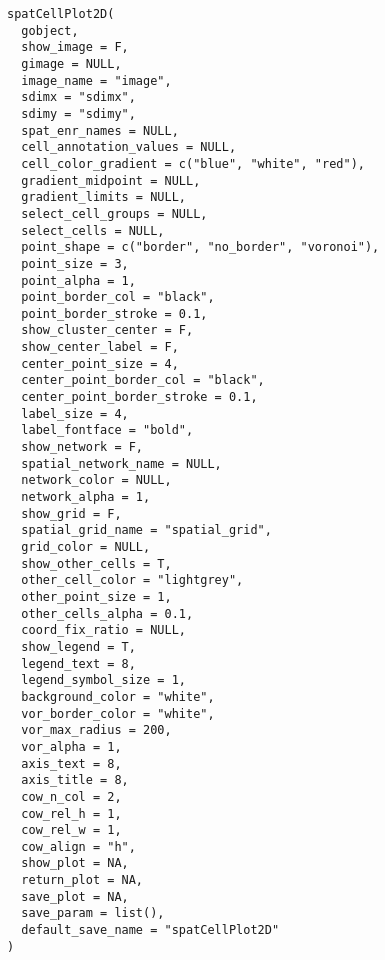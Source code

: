 \documentclass[a4paper]{book}
\begin{document}
\begin{Usage}
\begin{verbatim}
spatCellPlot2D(
  gobject,
  show_image = F,
  gimage = NULL,
  image_name = "image",
  sdimx = "sdimx",
  sdimy = "sdimy",
  spat_enr_names = NULL,
  cell_annotation_values = NULL,
  cell_color_gradient = c("blue", "white", "red"),
  gradient_midpoint = NULL,
  gradient_limits = NULL,
  select_cell_groups = NULL,
  select_cells = NULL,
  point_shape = c("border", "no_border", "voronoi"),
  point_size = 3,
  point_alpha = 1,
  point_border_col = "black",
  point_border_stroke = 0.1,
  show_cluster_center = F,
  show_center_label = F,
  center_point_size = 4,
  center_point_border_col = "black",
  center_point_border_stroke = 0.1,
  label_size = 4,
  label_fontface = "bold",
  show_network = F,
  spatial_network_name = NULL,
  network_color = NULL,
  network_alpha = 1,
  show_grid = F,
  spatial_grid_name = "spatial_grid",
  grid_color = NULL,
  show_other_cells = T,
  other_cell_color = "lightgrey",
  other_point_size = 1,
  other_cells_alpha = 0.1,
  coord_fix_ratio = NULL,
  show_legend = T,
  legend_text = 8,
  legend_symbol_size = 1,
  background_color = "white",
  vor_border_color = "white",
  vor_max_radius = 200,
  vor_alpha = 1,
  axis_text = 8,
  axis_title = 8,
  cow_n_col = 2,
  cow_rel_h = 1,
  cow_rel_w = 1,
  cow_align = "h",
  show_plot = NA,
  return_plot = NA,
  save_plot = NA,
  save_param = list(),
  default_save_name = "spatCellPlot2D"
)
\end{verbatim}
\end{Usage}
%
\end{document}
